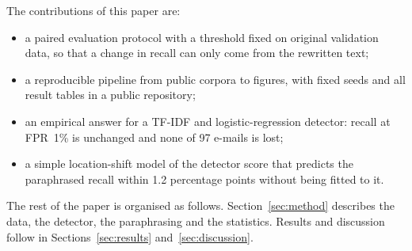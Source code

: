 The contributions of this paper are:
\begin{itemize}
  \item a paired evaluation protocol with a threshold fixed on original validation data, so that a change in recall can only come from the rewritten text;
  \item a reproducible pipeline from public corpora to figures, with fixed seeds and all result tables in a public repository;
  \item an empirical answer for a TF-IDF and logistic-regression detector: recall at FPR~1\% is unchanged and none of 97 e-mails is lost;
  \item a simple location-shift model of the detector score that predicts the paraphrased recall within 1.2 percentage points without being fitted to it.
\end{itemize}

The rest of the paper is organised as follows. Section~\ref{sec:method} describes the data, the detector, the paraphrasing and the statistics. Results and discussion follow in Sections~\ref{sec:results} and~\ref{sec:discussion}.
